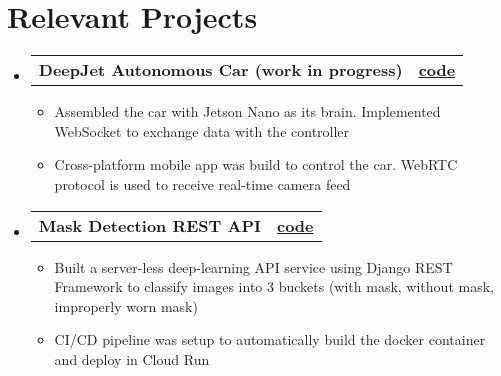 \documentclass[letterpaper,10pt]{article}
\makeatletter
\newcommand{\resumeItemClean}[1]{
    \item\small{
        {#1 \vspace{-2pt}}
    }
}
\newcommand{\projectheading}[3]{
    \vspace{-1pt}\item
        \begin{tabular*}{0.97\textwidth}{l@{\extracolsep{\fill}}r}
            \textbf{#1} & \textbf{#2} #3\\
    \end{tabular*}\vspace{-5pt}
}
\newcommand{\resumeSubHeadingListStart}{\begin{itemize}[leftmargin=*]}
\newcommand{\resumeSubHeadingListEnd}{\end{itemize}}
\newcommand{\resumeItemListStart}{\begin{itemize}}
\newcommand{\resumeItemListEnd}{\end{itemize}\vspace{-5pt}}
\makeatother
\begin{document}
\section{Relevant Projects}
    \resumeSubHeadingListStart
        \projectheading{DeepJet Autonomous Car (work in progress)}{\href{https://github.com/vinaykudari/eureka-bot}{code}}{}
            \resumeItemListStart
                \resumeItemClean
                    {Assembled the car with Jetson Nano as its brain. Implemented WebSocket to exchange data with the controller}
                \resumeItemClean
                    {Cross-platform mobile app was build to control the car. WebRTC protocol is used to receive real-time camera feed}
            \resumeItemListEnd
        \projectheading{Mask Detection REST API}{\href{https://github.com/vinaykudari/mask-detection-api}{code}}{}
            \resumeItemListStart
                \resumeItemClean
                    {Built a server-less deep-learning API service using Django REST Framework to classify images into 3 buckets (with mask, without mask, improperly worn mask)}
                \resumeItemClean
                    {CI/CD pipeline was setup to automatically build the docker container and deploy in Cloud Run}
            \resumeItemListEnd
    \resumeSubHeadingListEnd
    
\end{document}
